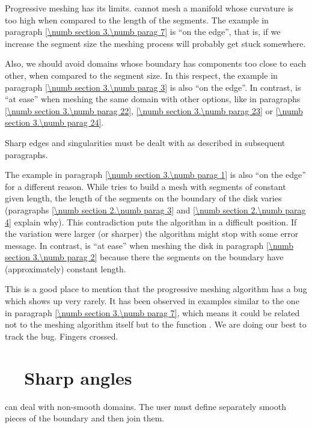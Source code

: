 Progressive meshing has its limits.
{\ManiFEM} cannot mesh a manifold whose curvature is too high when compared to the
length of the segments.
The example in paragraph \ref{\numb section 3.\numb parag 7} is ``on the edge'', that is,
if we increase the segment size the meshing process will probably get stuck somewhere.

Also, we should avoid domains whose boundary has components too close to each other,
when compared to the segment size.
In this respect, the example in paragraph \ref{\numb section 3.\numb parag 3} is also
``on the edge''.
In contrast, {\maniFEM} is ``at ease'' when meshing the same domain with other options,
like in paragraphs \ref{\numb section 3.\numb parag 22}, \ref{\numb section 3.\numb parag 23}
or \ref{\numb section 3.\numb parag 24}.

Sharp edges and singularities must be dealt with as described in subsequent paragraphs.

The example in paragraph \ref{\numb section 3.\numb parag 1} is also ``on the edge''
for a different reason.
While {\maniFEM} tries to build a mesh with segments of constant given length,
the length of the segments on the boundary of the disk varies (paragraphs
\ref{\numb section 2.\numb parag 3} and \ref{\numb section 2.\numb parag 4} explain why).
This contradiction puts the algorithm in a difficult position.
If the variation were larger (or sharper) the algorithm might stop with some error message.
In contrast, {\maniFEM} is ``at ease'' when meshing the disk in paragraph
\ref{\numb section 3.\numb parag 2} because there the segments on the boundary have
(approximately) constant length.

This is a good place to mention that the progressive meshing algorithm has a bug
which shows up very rarely.
It has been observed in examples similar to the one in paragraph
\ref{\numb section 3.\numb parag 7}, which means it could be related not to
the meshing algorithm itself but to the function {\small\tt {}}.
We are doing our best to track the bug. Fingers crossed.


\section{~~Sharp angles}\label{\numb section 3.\numb parag 17}

{\ManiFEM} can deal with non-smooth domains.
The user must define separately smooth pieces of the boundary and then join them.

